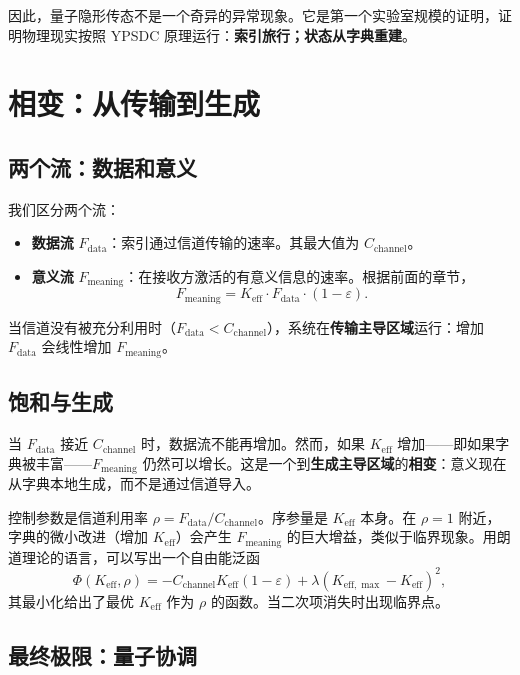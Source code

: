 \documentclass[12pt,a4paper]{article}
\theoremstyle{remark}
\newcommand{\Keff}{K_{\mathrm{eff}}}
\newcommand{\Keffmax}{K_{\mathrm{eff},\max}}
\begin{document}
	因此，量子隐形传态不是一个奇异的异常现象。它是第一个实验室规模的证明，证明物理现实按照 YPSDC 原理运行：\textbf{索引旅行；状态从字典重建}。
	
	\section{相变：从传输到生成}
	\label{sec:transition}
	
	\subsection{两个流：数据和意义}
	
	我们区分两个流：
	\begin{itemize}
		\item \textbf{数据流} $F_{\text{data}}$：索引通过信道传输的速率。其最大值为 $C_{\text{channel}}$。
		\item \textbf{意义流} $F_{\text{meaning}}$：在接收方激活的有意义信息的速率。根据前面的章节，
		\[
		F_{\text{meaning}} = \Keff \cdot F_{\text{data}} \cdot (1 - \varepsilon).
		\]
	\end{itemize}
	
	当信道没有被充分利用时（$F_{\text{data}} < C_{\text{channel}}$），系统在\textbf{传输主导区域}运行：增加 $F_{\text{data}}$ 会线性增加 $F_{\text{meaning}}$。
	
	\subsection{饱和与生成}
	
	当 $F_{\text{data}}$ 接近 $C_{\text{channel}}$ 时，数据流不能再增加。然而，如果 $\Keff$ 增加——即如果字典被丰富——$F_{\text{meaning}}$ 仍然可以增长。这是一个到\textbf{生成主导区域}的\textbf{相变}：意义现在从字典本地生成，而不是通过信道导入。
	
	控制参数是信道利用率 $\rho = F_{\text{data}} / C_{\text{channel}}$。序参量是 $\Keff$ 本身。在 $\rho = 1$ 附近，字典的微小改进（增加 $\Keff$）会产生 $F_{\text{meaning}}$ 的巨大增益，类似于临界现象。用朗道理论的语言，可以写出一个自由能泛函
	\[
	\Phi(\Keff, \rho) = -C_{\text{channel}} \Keff (1 - \varepsilon) + \lambda (\Keffmax - \Keff)^2,
	\]
	其最小化给出了最优 $\Keff$ 作为 $\rho$ 的函数。当二次项消失时出现临界点。
	
	\subsection{最终极限：量子协调}
	
\end{document}
